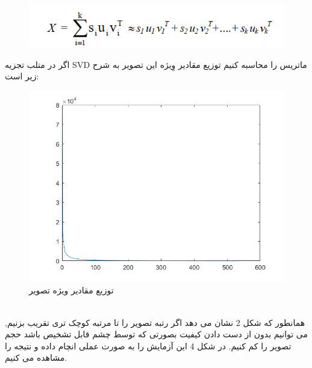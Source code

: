 \documentclass[12pt]{tehranReport}
\begin{document}
	\begin{figure}[h!]
		\centering
		\includegraphics[width=.8\linewidth, height=\textheight,keepaspectratio]{pics/8}
	\end{figure}
	\newpage
	اگر در متلب تجزیه SVD ماتریس را محاسبه کنیم توزیع مقادیر وِیژه این تصویر به شرح زیر است:
	\begin{figure}[h!]
		\centering
		\includegraphics[width=\linewidth, height=.3\textheight,keepaspectratio]{pics/2}
		\caption{ توزیع مقادیر ویژه تصویر}
	\end{figure}\\
	همانطور که شکل 2 نشان می دهد اگر رتبه تصویر را تا مرتبه کوچک تری تقریب بزنیم, می توانیم بدون از دست دادن کیفیت بصورتی که توسط چشم قابل تشخیص باشد حجم تصویر را کم  کنیم. در شکل 4 این آزمایش را به صورت عملی انچام داده و نتیجه را مشاهده می کنیم.
	\newpage
\end{document}
